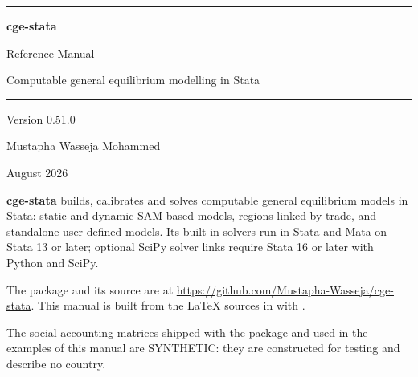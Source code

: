 \begin{titlepage}
\sffamily
\vspace*{40mm}
{\color{cgeblue}\rule{\textwidth}{1.2pt}}\par\vspace{10mm}
{\Huge\bfseries\color{cgeblue} cge-stata\par}
\vspace{4mm}
{\LARGE Reference Manual\par}
\vspace{10mm}
{\large Computable general equilibrium modelling in Stata\par}
\vspace{10mm}
{\color{cgeblue}\rule{\textwidth}{1.2pt}}\par
\vfill
{\large Version 0.51.0\par}
\vspace{2mm}
{\large Mustapha Wasseja Mohammed\par}
\vspace{2mm}
{\normalsize August 2026\par}
\vspace*{20mm}
\end{titlepage}

\thispagestyle{empty}
\vspace*{\fill}
{\small
\textbf{cge-stata} builds, calibrates and solves computable general equilibrium
models in Stata: static and dynamic SAM-based models, regions linked by trade,
and standalone user-defined models. Its built-in solvers run in Stata and Mata
on Stata 13 or later; optional SciPy solver links require Stata 16 or later
with Python and SciPy.

The package and its source are at
\url{https://github.com/Mustapha-Wasseja/cge-stata}. This manual is built from
the LaTeX sources in  with .

The social accounting matrices shipped with the package and used in the
examples of this manual are SYNTHETIC: they are constructed for testing and
describe no country.\par}
\clearpage
